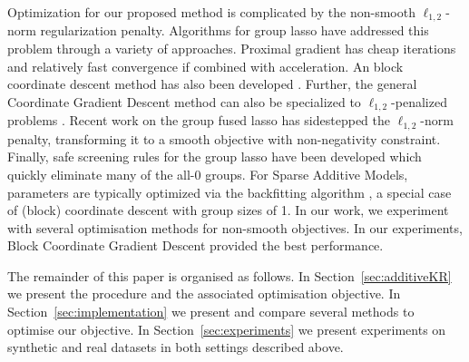 Optimization for our proposed method is complicated by 
the non-smooth $\ell_{1,2}$-norm regularization penalty.
Algorithms for group lasso have addressed this problem 
through a variety of approaches.
Proximal gradient \citep{beck2009fast}
has cheap iterations and relatively fast convergence if combined with acceleration.
An block coordinate descent method has also been developed \citep{bcd-group-lasso:2013}.
Further, the general Coordinate Gradient Descent method \citep{cgd:2009} 
can also be specialized to $\ell_{1,2}$-penalized problems 
\citep{meier2008group,note-group-lasso:2010}.
Recent work \citep{group-fused-lasso:2014} on the group fused lasso 
has sidestepped the $\ell_{1,2}$-norm penalty, transforming it to a 
smooth objective with non-negativity constraint.
Finally, safe screening rules for the group lasso have been developed 
\citep{group-lasso-screening:2013} which quickly eliminate many of the all-0 
groups.
For Sparse Additive Models, parameters are typically 
optimized via the backfitting algorithm \citep{ravikumar09spam}, 
a special case of (block) coordinate descent with group sizes of 1.
In our work, we experiment with several optimisation methods for non-smooth
objectives. In our experiments, Block Coordinate Gradient Descent provided the
best performance.

The remainder of this paper is organised as follows. 
In Section~\ref{sec:additiveKR} we present the \addkrrs procedure and the
associated optimisation objective.  In
Section~\ref{sec:implementation} we present and compare several methods to
optimise our objective. In Section~\ref{sec:experiments} we present experiments
on synthetic and real datasets in both settings described above.
